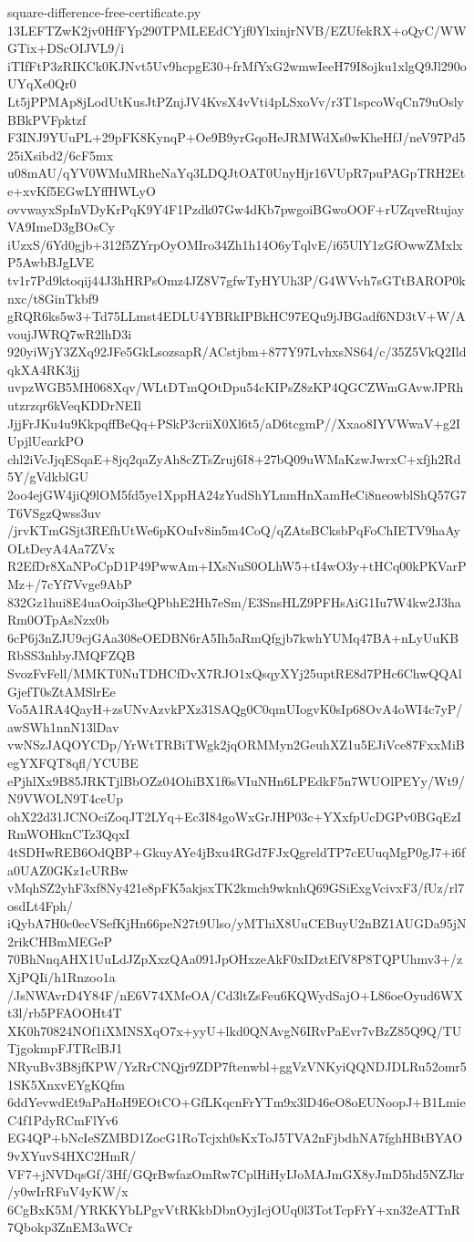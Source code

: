 \documentclass[11pt]{article}
\theoremstyle{definition}
\theoremstyle{remark}
\begin{document}
\begin{filecontents*}[overwrite]{square-difference-free-certificate.py}
13LEFTZwK2jv0HfFYp290TPMLEEdCYjf0YlxinjrNVB/EZUfekRX+oQyC/WWGTix+DScOIJVL9/i
iTIfFtP3zRIKCk0KJNvt5Uv9hcpgE30+frMfYxG2wmwIeeH79I8ojku1xlgQ9Jl290oUYqXe0Qr0
Lt5jPPMAp8jLodUtKusJtPZnjJV4KvsX4vVti4pLSxoVv/r3T1spcoWqCn79uOslyBBkPVFpktzf
F3INJ9YUuPL+29pFK8KynqP+Oe9B9yrGqoHeJRMWdXs0wKheHfJ/neV97Pd525iXsibd2/6cF5mx
u08mAU/qYV0WMuMRheNaYq3LDQJtOAT0UnyHjr16VUpR7puPAGpTRH2Ete+xvKf5EGwLYffHWLyO
ovvwayxSpInVDyKrPqK9Y4F1Pzdk07Gw4dKb7pwgoiBGwoOOF+rUZqveRtujayVA9ImeD3gBOsCy
iUzxS/6Yd0gjb+312f5ZYrpOyOMIro34Zh1h14O6yTqlvE/i65UlY1zGfOwwZMxlxP5AwbBJgLVE
tv1r7Pd9ktoqij44J3hHRPsOmz4JZ8V7gfwTyHYUh3P/G4WVvh7sGTtBAROP0knxc/t8GinTkbf9
gRQR6ks5w3+Td75LLmst4EDLU4YBRkIPBkHC97EQu9jJBGadf6ND3tV+W/AvoujJWRQ7wR2lhD3i
920yiWjY3ZXq92JFe5GkLsozsapR/ACstjbm+877Y97LvhxsNS64/c/35Z5VkQ2IldqkXA4RK3jj
uvpzWGB5MH068Xqv/WLtDTmQOtDpu54cKIPsZ8zKP4QGCZWmGAvwJPRhutzrzqr6kVeqKDDrNEIl
JjjFrJKu4u9KkpqffBeQq+PSkP3criiX0Xl6t5/aD6tcgmP//Xxao8IYVWwaV+g2IUpjlUearkPO
chl2iVcJjqESqaE+8jq2qaZyAh8cZTsZruj6I8+27bQ09uWMaKzwJwrxC+xfjh2Rd5Y/gVdkblGU
2oo4ejGW4jiQ9lOM5fd5ye1XppHA24zYudShYLnmHnXamHeCi8neowblShQ57G7T6VSgzQwss3uv
/jrvKTmGSjt3REfhUtWe6pKOuIv8in5m4CoQ/qZAtsBCksbPqFoChIETV9haAyOLtDeyA4Aa7ZVx
R2EfDr8XaNPoCpD1P49PwwAm+IXsNuS0OLhW5+tI4wO3y+tHCq00kPKVarPMz+/7cYf7Vvge9AbP
832Gz1hui8E4uaOoip3heQPbhE2Hh7eSm/E3SnsHLZ9PFHsAiG1Iu7W4kw2J3haRm0OTpAsNzx0b
6cP6j3nZJU9cjGAa308eOEDBN6rA5Ih5aRmQfgjb7kwhYUMq47BA+nLyUuKBRbSS3nhbyJMQFZQB
SvozFvFell/MMKT0NuTDHCfDvX7RJO1xQsqyXYj25uptRE8d7PHc6ChwQQAlGjefT0sZtAMSlrEe
Vo5A1RA4QayH+zsUNvAzvkPXz31SAQg0C0qmUIogvK0sIp68OvA4oWI4c7yP/awSWh1nnN13lDav
vwNSzJAQOYCDp/YrWtTRBiTWgk2jqORMMyn2GeuhXZ1u5EJiVce87FxxMiBegYXFQT8qfl/YCUBE
ePjhlXx9B85JRKTjlBbOZz04OhiBX1f6sVIuNHn6LPEdkF5n7WUOlPEYy/Wt9/N9VWOLN9T4ceUp
ohX22d31JCNOciZoqJT2LYq+Ec3I84goWxGrJHP03c+YXxfpUcDGPv0BGqEzIRmWOHknCTz3QqxI
4tSDHwREB6OdQBP+GkuyAYe4jBxu4RGd7FJxQgreldTP7cEUuqMgP0gJ7+i6fa0UAZ0GKz1cURBw
vMqhSZ2yhF3xf8Ny421e8pFK5akjsxTK2kmch9wknhQ69GSiExgVcivxF3/fUz/rl7osdLt4Fph/
iQybA7H0c0ecVSefKjHn66peN27t9Ulso/yMThiX8UuCEBuyU2nBZ1AUGDa95jN2rikCHBmMEGeP
70BhNnqAHX1UuLdJZpXxzQAa091JpOHxzeAkF0xIDztEfV8P8TQPUhmv3+/zXjPQIi/h1Rnzoo1a
/JsNWAvrD4Y84F/nE6V74XMeOA/Cd3ltZsFeu6KQWydSajO+L86oeOyud6WXt3l/rb5PFAOOHt4T
XK0h70824NOf1iXMNSXqO7x+yyU+lkd0QNAvgN6IRvPaEvr7vBzZ85Q9Q/TUTjgokmpFJTRclBJ1
NRyuBv3B8jfKPW/YzRrCNQjr9ZDP7ftenwbl+ggVzVNKyiQQNDJDLRu52omr51SK5XnxvEYgKQfm
6ddYevwdEt9aPaHoH9EOtCO+GfLKqcnFrYTm9x3lD46eO8oEUNoopJ+B1LmieC4f1PdyRCmFlYv6
EG4QP+bNcIeSZMBD1ZocG1RoTcjxh0sKxToJ5TVA2nFjbdhNA7fghHBtBYAO9vXYuvS4HXC2HmR/
VF7+jNVDqsGf/3Hf/GQrBwfazOmRw7CplHiHyIJoMAJmGX8yJmD5hd5NZJkr/y0wIrRFuV4yKW/x
6CgBxK5M/YRKKYbLPgvVtRKkbDbnOyjIcjOUq0l3TotTcpFrY+xn32eATTnR7Qbokp3ZnEM3aWCr

\end{filecontents*}
\end{document}
